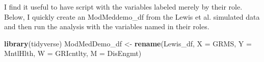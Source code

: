 \documentclass[
  11pt,
]{book}
\newenvironment{Shaded}{\begin{snugshade}}{\end{snugshade}}
\newcommand{\AttributeTok}[1]{\textcolor[rgb]{0.27,0.27,0.27}{#1}}
\newcommand{\FunctionTok}[1]{\textcolor[rgb]{0.27,0.27,0.27}{\textbf{#1}}}
\newcommand{\NormalTok}[1]{#1}
\newcommand{\OtherTok}[1]{\textcolor[rgb]{0.37,0.37,0.37}{#1}}
\begin{document}
I find it useful to have script with the variables labeled merely by their role. Below, I quickly create an ModMeddemo\_df from the Lewis et al. \citep{lewis_applying_2017} simulated data and then run the analysis with the variables named in their roles.

\begin{Shaded}
\begin{Highlighting}[]
\FunctionTok{library}\NormalTok{(tidyverse)}
\NormalTok{ModMedDemo\_df }\OtherTok{\textless{}{-}} \FunctionTok{rename}\NormalTok{(Lewis\_df, }\AttributeTok{X =}\NormalTok{ GRMS, }\AttributeTok{Y =}\NormalTok{ MntlHlth, }\AttributeTok{W =}\NormalTok{ GRIcntlty,}
    \AttributeTok{M =}\NormalTok{ DisEngmt)}
\end{Highlighting}
\end{Shaded}
\end{document}
